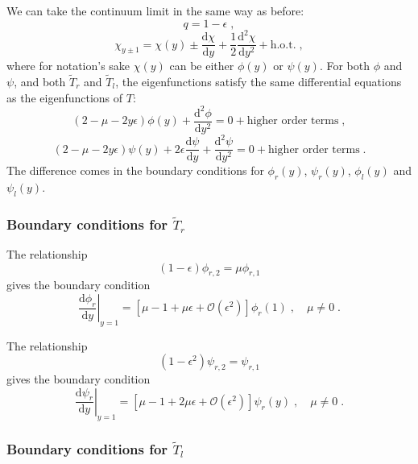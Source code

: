 \documentclass[a4paper,10pt]{article}
\newcommand{\D}{\mathrm{d}}
\newcommand{\Or}{\mathcal{O}}
\begin{document}
We can take the continuum limit in the same way as before:
\begin{equation}
  q = 1 - \epsilon \;,
\end{equation}
\begin{equation}
  \chi_{y\pm 1} = \chi(y) \pm \frac{\D \chi }{\D y} + \frac{1}{2} \frac{ \D^2 \chi}{\D y^2} + \mbox{h.o.t.} \;,
\end{equation}
where for notation's sake $\chi(y)$ can be either $\phi(y)$ or $\psi(y)$. For both $\phi$ and $\psi$, and both $\tilde{T}_r$ and $\tilde{T}_l$, the eigenfunctions satisfy the same differential equations as the eigenfunctions of $T$:
\begin{equation}\label{eq:ctm}
  (2-\mu - 2y\epsilon) \phi(y) + \frac{\D^2 \phi}{\D y^2} = 0 + \mbox{higher order terms} \;, %
\end{equation}
\begin{equation}
  (2-\mu - 2y\epsilon) \psi(y) + 2\epsilon \frac{\D \psi}{\D y} + \frac{\D^2 \psi}{\D y^2} = 0 + \mbox{higher order terms} \;.
\end{equation}
The difference comes in the boundary conditions for $\phi_r(y)$, $\psi_r(y)$, $\phi_l(y)$ and $\psi_l(y)$.

\subsubsection{Boundary conditions for $\tilde{T}_r$}

The relationship
\begin{equation}
  (1-\epsilon) \phi_{r,2} = \mu \phi_{r,1}
\end{equation}
gives the boundary condition
\begin{equation}\label{eq:rr_bc}
  \left. \frac{ \D \phi_r}{\D y} \right|_{y=1} = [\mu - 1 + \mu \epsilon + \Or(\epsilon^2) ] \phi_r(1) \;, \quad \mu \ne 0 \;.
\end{equation}
 
The relationship
\begin{equation}
 (1-\epsilon^2) \psi_{r,2} = \psi_{r,1}   
\end{equation}
gives the boundary condition
\begin{equation}\label{eq:rl_bc}
  \left. \frac{ \D \psi_r}{ \D y} \right|_{y=1} = [\mu -1  + 2\mu\epsilon + \Or(\epsilon^2) ] \psi_r(y) \;, \quad \mu \ne 0 \;.
\end{equation}

\subsubsection{Boundary conditions for $\tilde{T}_l$}
\end{document}
